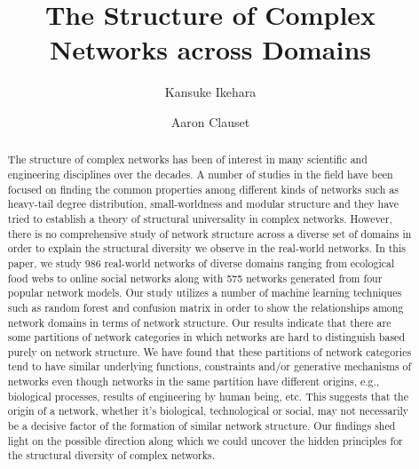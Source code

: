 \documentclass[%
 reprint,
 amsmath,amssymb,
 aps,
superscriptaddress,
]{revtex4-1}
\begin{document}

\title{The Structure of Complex Networks across Domains}%

\author{Kansuke Ikehara}

 
\author{Aaron Clauset}

 

\begin{abstract}
The structure of complex networks has been of interest in many scientific and engineering disciplines over the decades. A number of studies in the field have been focused on finding the common properties among different kinds of networks such as heavy-tail degree distribution, small-worldness and modular structure and they have tried to establish a theory of structural universality in complex networks. However, there is no comprehensive study of network structure across a diverse set of domains in order to explain the structural diversity we observe in the real-world networks. In this paper, we study 986 real-world networks of diverse domains ranging from ecological food webs to online social networks along with 575 networks generated from four popular network models. Our study utilizes a number of  machine learning techniques such as random forest and confusion matrix in order to show the relationships among network domains in terms of network structure. Our results indicate that there are some partitions of network categories in which networks are hard to distinguish based purely on network structure. We have found that these partitions of network categories tend to have similar underlying functions, constraints and/or generative mechanisms of networks even though networks in the same partition have different origins, e.g., biological processes, results of engineering by human being, etc. This suggests that the origin of a network, whether it's biological, technological or social, may not necessarily be a decisive factor of the formation of similar network structure. Our findings shed light on the possible direction along which we could uncover the hidden principles for the structural diversity of complex networks.
\end{abstract}
\end{document}
